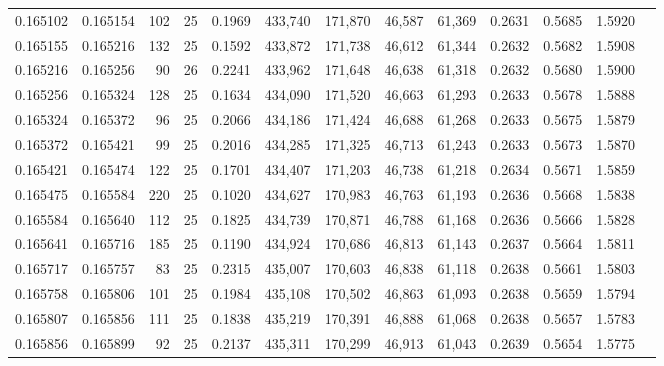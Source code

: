 \begin{tabular}{rrrrrrrrrrrrr}
0.165102 & 0.165154 &   102 &  25 &                                     0.1969 & 433,740 & 171,870 &  46,587 &  61,369 & 0.2631 & 0.5685 & 1.5920 \\
0.165155 & 0.165216 &   132 &  25 &                                     0.1592 & 433,872 & 171,738 &  46,612 &  61,344 & 0.2632 & 0.5682 & 1.5908 \\
0.165216 & 0.165256 &    90 &  26 &                                     0.2241 & 433,962 & 171,648 &  46,638 &  61,318 & 0.2632 & 0.5680 & 1.5900 \\
0.165256 & 0.165324 &   128 &  25 &                                     0.1634 & 434,090 & 171,520 &  46,663 &  61,293 & 0.2633 & 0.5678 & 1.5888 \\
0.165324 & 0.165372 &    96 &  25 &                                     0.2066 & 434,186 & 171,424 &  46,688 &  61,268 & 0.2633 & 0.5675 & 1.5879 \\
0.165372 & 0.165421 &    99 &  25 &                                     0.2016 & 434,285 & 171,325 &  46,713 &  61,243 & 0.2633 & 0.5673 & 1.5870 \\
0.165421 & 0.165474 &   122 &  25 &                                     0.1701 & 434,407 & 171,203 &  46,738 &  61,218 & 0.2634 & 0.5671 & 1.5859 \\
0.165475 & 0.165584 &   220 &  25 &                                     0.1020 & 434,627 & 170,983 &  46,763 &  61,193 & 0.2636 & 0.5668 & 1.5838 \\
0.165584 & 0.165640 &   112 &  25 &                                     0.1825 & 434,739 & 170,871 &  46,788 &  61,168 & 0.2636 & 0.5666 & 1.5828 \\
0.165641 & 0.165716 &   185 &  25 &                                     0.1190 & 434,924 & 170,686 &  46,813 &  61,143 & 0.2637 & 0.5664 & 1.5811 \\
0.165717 & 0.165757 &    83 &  25 &                                     0.2315 & 435,007 & 170,603 &  46,838 &  61,118 & 0.2638 & 0.5661 & 1.5803 \\
0.165758 & 0.165806 &   101 &  25 &                                     0.1984 & 435,108 & 170,502 &  46,863 &  61,093 & 0.2638 & 0.5659 & 1.5794 \\
0.165807 & 0.165856 &   111 &  25 &                                     0.1838 & 435,219 & 170,391 &  46,888 &  61,068 & 0.2638 & 0.5657 & 1.5783 \\
0.165856 & 0.165899 &    92 &  25 &                                     0.2137 & 435,311 & 170,299 &  46,913 &  61,043 & 0.2639 & 0.5654 & 1.5775 \\

\end{tabular}
